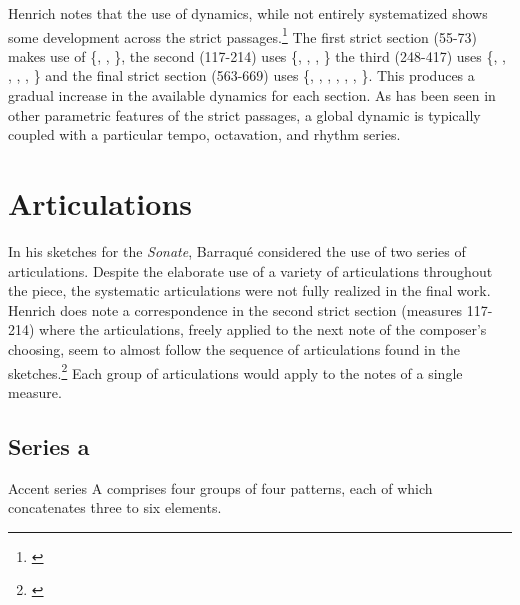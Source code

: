 Henrich notes that the use of dynamics, while not entirely systematized shows some development across the strict passages.\footnote{\citet[53]{barraque-werk}} The first strict section (55-73) makes use of \{, , \}, the second (117-214) uses \{, , , \} the third (248-417) uses \{, , , , , \} and the final strict section (563-669) uses \{, , , , , , \}. This produces a gradual increase in the available dynamics for each section. As has been seen in other parametric features of the strict passages, a global dynamic is typically coupled with a particular tempo, octavation, and rhythm series.

\section{Articulations}

In his sketches for the \textit{Sonate}, Barraqué considered the use of two series of articulations. Despite the elaborate use of a variety of articulations throughout the piece, the systematic articulations were not fully realized in the final work. Henrich does note a correspondence in the second strict section (measures 117-214) where the articulations, freely applied to the next note of the composer's choosing, seem to almost follow the sequence of articulations found in the sketches.\footnote{\citet[54]{barraque-werk}} Each group of articulations would apply to the notes of a single measure.

\subsection{Series a}

Accent series A comprises four groups of four patterns, each of which concatenates three to six elements. 

